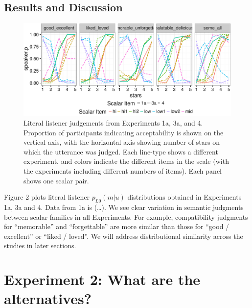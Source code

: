 \documentclass[10pt, letterpaper]{article}
\newenvironment{CodeChunk}{}{}
\begin{document}
\subsection{Results and Discussion}\label{results-and-discussion}

\begin{CodeChunk}
\captionsetup{width=0.8\textwidth}\begin{figure}[t]

{\centering \includegraphics{figs/exp1Plots-1} 

}

\caption[Literal listener judgements from Experiments 1a, 3a, and 4]{Literal listener judgements from Experiments 1a, 3a, and 4. Proportion of participants indicating acceptability is shown on the vertical axis, with the horizontal axis showing number of stars on which the utterance was judged. Each line-type shows a different experiment, and colors indicate the different items in the scale (with the experiments including different numbers of items).  Each panel shows one scalar pair.}\label{fig:exp1Plots}
\end{figure}
\end{CodeChunk}

Figure 2 plots literal listener \(p_{L0}(m|u)\) distributions obtained
in Experiments 1a, 3a and 4. Data from 1a is (\ldots{}). We see clear
variation in semantic judgments between scalar families in all
Experiments. For example, compatibility judgments for ``memorable'' and
``forgettable'' are more similar than those for ``good / excellent'' or
``liked / loved''. We will address distributional similarity across the
studies in later sections.

\section{Experiment 2: What are the
alternatives?}\label{experiment-2-what-are-the-alternatives}
\end{document}
